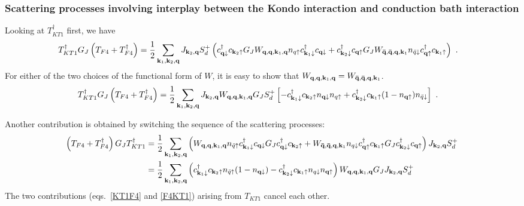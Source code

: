 \documentclass[reprint,hidelinks]{revtex4-2}
\begin{document}
\begin{widetext}
\subsubsection*{Scattering processes involving interplay between the Kondo interaction and conduction bath interaction}
Looking at \(T_{KT1}^\dagger\) first, we have
\begin{equation}\begin{aligned}\label{t7t6}
	T_{KT1}^\dagger G_J \left(T_{F4} + T_{F4}^\dagger\right) &= \frac{1}{2}\sum_{{\bf k}_1,{\bf k}_2,{\bf q}} J_{{\bf k}_2, {\bf q}}S_d^+ \left(c^\dagger_{{\bf q}\downarrow}c_{{\bf k}_2\uparrow}  G_J W_{{\bf q}, {\bf q}, {\bf k}_1, {\bf q}} n_{q \uparrow} c^\dagger_{{\bf k}_1 \downarrow} c_{{\bf q} \downarrow} + c^\dagger_{{\bf k}_2\downarrow}c_{{\bf q}\uparrow}  G_J W_{{\bf \bar q}, {\bf \bar q}, {\bf q}, {\bf k}_1} n_{\bar q \downarrow} c^\dagger_{{\bf q} \uparrow} c_{{\bf k}_1 \uparrow}\right) ~.
\end{aligned}\end{equation}
For either of the two choices of the functional form of \(W\), it is easy to show that \(W_{{\bf q}, {\bf q}, {\bf k}_1, {\bf q}} = W_{{\bf \bar q}, {\bf \bar q}, {\bf q}, {\bf k}_1}\).
\begin{equation}\begin{aligned}\label{KT1F4}
	T_{KT1}^\dagger G_J \left(T_{F4} + T_{F4}^\dagger\right) &= \frac{1}{2}\sum_{{\bf k}_1,{\bf k}_2,{\bf q}} J_{{\bf k}_2, {\bf q}} W_{{\bf q}, {\bf q}, {\bf k}_1, {\bf q}} G_J S_d^+ \left[-c^\dagger_{{\bf k}_1 \downarrow}c_{{\bf k}_2\uparrow} n_{{\bf q}\downarrow} n_{q \uparrow} + c^\dagger_{{\bf k}_2\downarrow} c_{{\bf k}_1 \uparrow} (1 - n_{{\bf q}\uparrow}) n_{\bar q \downarrow}\right] ~.
\end{aligned}\end{equation}

Another contribution is obtained by switching the sequence of the scattering processes:
\begin{equation}\begin{aligned}\label{F4KT1}
	\left(T_{F4} + T_{F4}^\dagger\right) G_J T_{KT1}^\dagger &= \frac{1}{2}\sum_{{\bf k}_1,{\bf k}_2,{\bf q}} \left(W_{{\bf q}, {\bf q}, {\bf k}_1, {\bf q}} n_{\bar q \uparrow} c^\dagger_{{\bf k}_1 \downarrow} c_{{\bf q} \downarrow} G_J c^\dagger_{{\bf q}\downarrow}c_{{\bf k}_2\uparrow} + W_{{\bf \bar q}, {\bf \bar q}, {\bf q}, {\bf k}_1} n_{q \downarrow} c^\dagger_{{\bf q} \uparrow} c_{{\bf k}_1 \uparrow} G_J c^\dagger_{{\bf k}_2\downarrow}c_{{\bf q}\uparrow} \right) J_{{\bf k}_2, {\bf q}}S_d^+\\
															 &= \frac{1}{2}\sum_{{\bf k}_1,{\bf k}_2,{\bf q}} \left(c^\dagger_{{\bf k}_1 \downarrow} c_{{\bf k}_2\uparrow} n_{\bar q \uparrow} (1 - n_{{\bf q} \downarrow}) - c^\dagger_{{\bf k}_2\downarrow}c_{{\bf k}_1 \uparrow}n_{q \downarrow} n_{{\bf q} \uparrow}\right) W_{{\bf q}, {\bf q}, {\bf k}_1, {\bf q}} G_J J_{{\bf k}_2, {\bf q}}S_d^+
\end{aligned}\end{equation}
The two contributions (eqs.~\ref{KT1F4} and \ref{F4KT1}) arising from \(T_{KT1}\) cancel each other.


\end{widetext}
\end{document}
